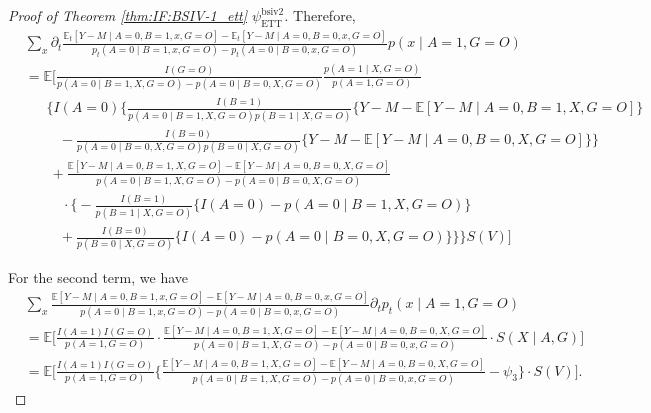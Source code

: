 \documentclass[10pt]{article}
\begin{document}
\begin{proof}[Proof of Theorem \ref{thm:IF:BSIV-1_ett} $\psi_{\text{ETT}}^{\text{bsiv2}}$]
Therefore,
{\footnotesize \begin{align*}
    &\sum_{x}\partial_t\frac{\mathbb{E}_t[Y-M\mid A=0,B=1,x,G=O]-\mathbb{E}_t[Y-M\mid A=0,B=0,x,G=O]}{p_t(A=0\mid B=1,x,G=O)-p_t(A=0\mid B=0,x,G=O)}p(x\mid A=1,G=O)\\
    &=\mathbb{E}\bigg[\frac{I(G=O)}{p(A=0\mid B=1,X,G=O)-p(A=0\mid B=0,X,G=O)}\frac{p(A=1\mid X, G=O)}{p(A=1,G=O)}\\
    &\ \ \ \ \ \ \ \bigg\{I(A=0)\big\{\frac{I(B=1)}{p(A=0\mid B=1,X,G=O)p(B=1\mid X,G=O)}\{Y-M-\mathbb{E}[Y-M\mid A=0,B=1,X,G=O]\}\\
    &\ \ \ \ \ \ \ \ \ \ \ -\frac{I(B=0)}{p(A=0\mid B=0,X,G=O)p(B=0\mid X,G=O)}\{Y-M-\mathbb{E}[Y-M\mid A=0,B=0,X,G=O]\}\big\}\\
    &\ \ \ \ \ \ \ \ +\frac{\mathbb{E}[Y-M\mid A=0,B=1,X,G=O]-\mathbb{E}[Y-M\mid A=0,B=0,X,G=O]}{p(A=0\mid B=1,X,G=O)-p(A=0\mid B=0,X,G=O)}\\
    &\ \ \ \ \ \ \ \ \ \ \ \ \cdot\big\{-\frac{I(B=1)}{p(B=1\mid X, G=O)}\{I(A=0)-p(A=0\mid B=1,X,G=O)\}\\
    &\ \ \ \ \ \ \ \ \ \ \ +\frac{I(B=0)}{p(B=0\mid X, G=O)}\{I(A=0)-p(A=0\mid B=0,X,G=O)\}\big\}\bigg\}S(V)\bigg]
\end{align*}}

For the second term, we have
{\footnotesize \begin{align*}
    &\sum_{x}\frac{\mathbb{E}[Y-M\mid A=0,B=1,x,G=O]-\mathbb{E}[Y-M\mid A=0,B=0,x,G=O]}{p(A=0\mid B=1,x,G=O)-p(A=0\mid B=0,x,G=O)}\partial_tp_t(x\mid A=1,G=O)\\
    &=\mathbb{E}\bigg[\frac{I(A=1)I(G=O)}{p(A=1,G=O)}\cdot\frac{\mathbb{E}[Y-M\mid A=0,B=1,X,G=O]-\mathbb{E}[Y-M\mid A=0,B=0,X,G=O]}{p(A=0\mid B=1,X,G=O)-p(A=0\mid B=0,x,G=O)}\cdot S(X\mid A,G)\bigg]\\
    &=\mathbb{E}\bigg[\frac{I(A=1)I(G=O)}{p(A=1,G=O)}\bigg\{\frac{\mathbb{E}[Y-M\mid A=0,B=1,X,G=O]-\mathbb{E}[Y-M\mid A=0,B=0,X,G=O]}{p(A=0\mid B=1,X,G=O)-p(A=0\mid B=0,x,G=O)}-\psi_3\bigg\}\cdot S(V)\bigg].
\end{align*}}


\end{proof}
\end{document}
